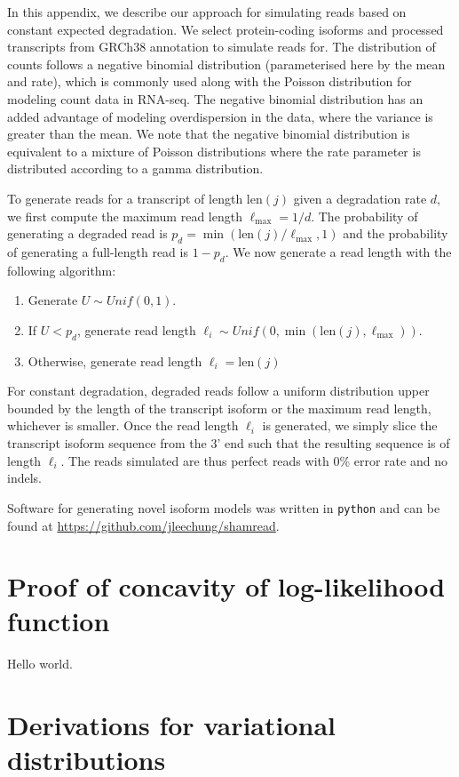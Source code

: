 In this appendix, we describe our approach for simulating reads based on constant expected degradation. We select protein-coding isoforms and processed transcripts from GRCh38 annotation to simulate reads for. The distribution of counts follows a negative binomial distribution (parameterised here by the mean and rate), which is commonly used along with the Poisson distribution for modeling count data in RNA-seq. The negative binomial distribution has an added advantage of modeling overdispersion in the data, where the variance is greater than the mean. We note that the negative binomial distribution is equivalent to a mixture of Poisson distributions where the rate parameter is distributed according to a gamma distribution. 

To generate reads for a transcript of length $\mathrm{len}(j)$ given a degradation rate $d$, we first compute the maximum read length $\ell_\mathrm{max}=1/d$. The probability of generating a degraded read is $p_d=\min(\mathrm{len}(j)/\ell_\mathrm{max}, 1)$ and the probability of generating a full-length read is $1-p_d$. We now generate a read length with the following algorithm:
\begin{enumerate}
    \item Generate $U\sim Unif(0,1)$.
    \item If $U<p_d$, generate read length $\ell_i\sim Unif(0,\min(\mathrm{len}(j),\ell_\mathrm{max}))$.
    \item Otherwise, generate read length $\ell_i=\mathrm{len}(j)$
\end{enumerate}
For constant degradation, degraded reads follow a uniform distribution upper bounded by the length of the transcript isoform or the maximum read length, whichever is smaller. Once the read length $\ell_i$ is generated, we simply slice the transcript isoform sequence from the 3' end such that the resulting sequence is of length $\ell_i$. The reads simulated are thus perfect reads with 0\% error rate and no indels. 

Software for generating novel isoform models was written in \texttt{python} and can be found at \url{https://github.com/jleechung/shamread}.

\chapter{Proof of concavity of log-likelihood function}\label{sec:proof-log-lik}

Hello world.

\chapter{Derivations for variational distributions}\label{sec:variational-dist}


